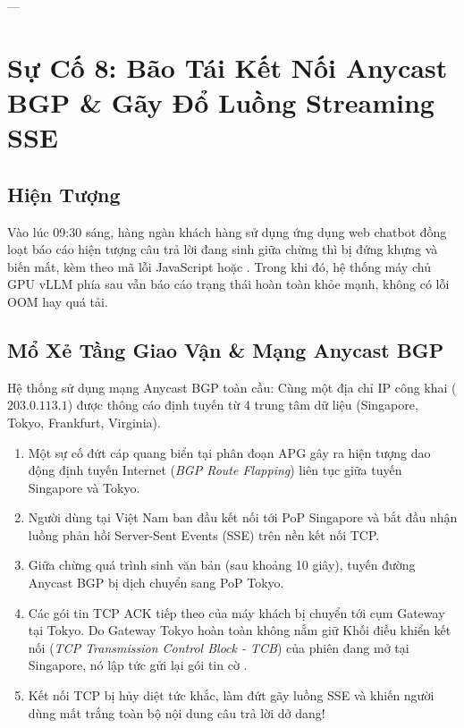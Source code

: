 ---

\section{Sự Cố 8: Bão Tái Kết Nối Anycast BGP \& Gãy Đổ Luồng Streaming SSE}
\label{sec:postmortem-anycast-bgp-flapping}

\subsection{Hiện Tượng}
Vào lúc 09:30 sáng, hàng ngàn khách hàng sử dụng ứng dụng web chatbot đồng loạt báo cáo hiện tượng câu trả lời đang sinh giữa chừng thì bị đứng khựng và biến mất, kèm theo mã lỗi JavaScript  hoặc .
Trong khi đó, hệ thống máy chủ GPU vLLM phía sau vẫn báo cáo trạng thái hoàn toàn khỏe mạnh, không có lỗi OOM hay quá tải.

\subsection{Mổ Xẻ Tầng Giao Vận \& Mạng Anycast BGP}
Hệ thống sử dụng mạng Anycast BGP toàn cầu: Cùng một địa chỉ IP công khai ($203.0.113.1$) được thông cáo định tuyến từ 4 trung tâm dữ liệu (Singapore, Tokyo, Frankfurt, Virginia).
\begin{enumerate}
  \item Một sự cố đứt cáp quang biển tại phân đoạn APG gây ra hiện tượng dao động định tuyến Internet (\textit{BGP Route Flapping}) liên tục giữa tuyến Singapore và Tokyo.
  \item Người dùng tại Việt Nam ban đầu kết nối tới PoP Singapore và bắt đầu nhận luồng phản hồi Server-Sent Events (SSE) trên nền kết nối TCP.
  \item Giữa chừng quá trình sinh văn bản (sau khoảng 10 giây), tuyến đường Anycast BGP bị dịch chuyển sang PoP Tokyo.
  \item Các gói tin TCP ACK tiếp theo của máy khách bị chuyển tới cụm Gateway tại Tokyo. Do Gateway Tokyo hoàn toàn không nắm giữ Khối điều khiển kết nối (\textit{TCP Transmission Control Block - TCB}) của phiên đang mở tại Singapore, nó lập tức gửi lại gói tin cờ .
  \item Kết nối TCP bị hủy diệt tức khắc, làm đứt gãy luồng SSE và khiến người dùng mất trắng toàn bộ nội dung câu trả lời dở dang!
\end{enumerate}

